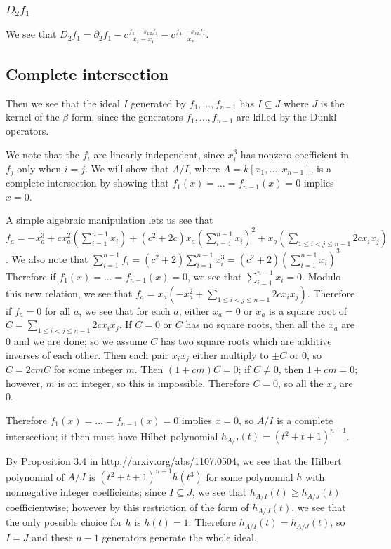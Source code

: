 \documentclass{article}
\numberwithin{equation}{section}
\begin{document}
\subsubsection{$D_2f_1$}

We see that $D_2f_1 = \partial_2f_1-c\frac{f_1-s_{12}f_1}{x_2-x_1} -c\frac{f_1-s_{02}f_1}{x_2}$. 







\subsection{Complete intersection}

Then we see that the ideal $I$ generated by $f_1,\dots,f_{n-1}$ has $I \subseteq J$ where $J$ is the kernel of the $\beta$ form, since the generators $f_1,\dots,f_{n-1}$ are killed by the Dunkl operators. 

We note that the $f_i$ are linearly independent, since $x_i^3$ has nonzero coefficient in $f_j$ only when $i=j$. We will show that $A/I$, where $A=k[x_1,\dots,x_{n-1}]$, is a complete intersection by showing that $f_1(x) = \dots = f_{n-1}(x)=0$ implies $x=0$. 

A simple algebraic manipulation lets us see that $f_a=-x_a^3+c x_a^2\left(\sum_{i=1}^{n-1} x_i \right)+(c^2+2c)x_a\left(\sum_{i=1}^{n-1} x_i\right)^2+x_a\left(\sum_{1 \le i < j  \le n-1} 2cx_ix_j\right)$. %
We also note that $\sum_{i=1}^{n-1} f_i = (c^2+2)\sum_{i=1}^{n-1} x_i^3 = (c^2+2)\left(\sum_{i=1}^{n-1} x_i \right)^3$ %
Therefore if $f_1(x) = \dots = f_{n-1}(x)=0$, we see that $\sum_{i=1}^{n-1} x_i = 0$. %
Modulo this new relation, we see that $f_a=x_a\left(-x_a^2+\sum_{1 \le i < j  \le n-1} 2cx_ix_j\right)$. Therefore if $f_a=0$ for all $a$, we see that for each $a$, either $x_a=0$ or $x_a$ is a square root of $C=\sum_{1 \le i < j  \le n-1} 2cx_ix_j$. If $C=0$ or $C$ has no square roots, then all the $x_a$ are 0 and we are done; so we assume $C$ has two square roots which are additive inverses of each other. Then each pair $x_ix_j$ either multiply to $\pm C$ or $0$, so $C=2cmC$ for some integer $m$. Then $(1+cm)C=0$; if $C \ne 0$, then $1+cm=0$; however, $m$ is an integer, so this is impossible. Therefore $C=0$, so all the $x_a$ are $0$.

Therefore $f_1(x) = \dots = f_{n-1}(x)=0$ implies $x=0$, so $A/I$ is a complete intersection; it then must have Hilbet polynomial $h_{A/I}(t)=(t^2+t+1)^{n-1}$. 

By Proposition 3.4 in http://arxiv.org/abs/1107.0504, we see that the Hilbert polynomial of $A/J$ is $(t^2+t+1)^{n-1}h(t^3)$ for some polynomial $h$ with nonnegative integer coefficients; since $I \subseteq J$, we see that $h_{A/I}(t) \ge h_{A/J}(t)$ coefficientwise; however by this restriction of the form of $h_{A/J}(t)$, we see that the only possible choice for $h$ is $h(t)=1$. Therefore $h_{A/I}(t)=h_{A/J}(t)$, so $I=J$ and these $n-1$ generators generate the whole ideal.
\end{document}
